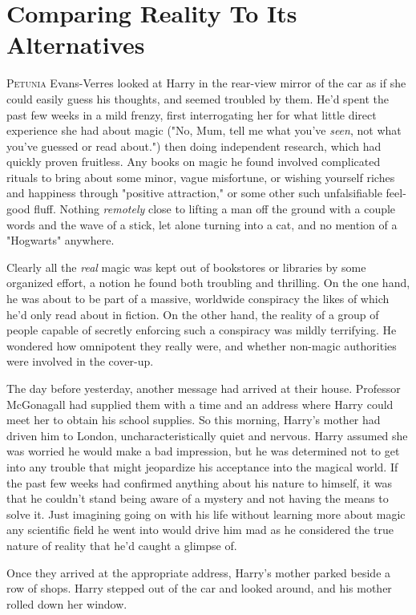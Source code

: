\chapter{Comparing Reality To Its Alternatives}

\lettrine{P}{etunia} Evans-Verres looked at Harry in the rear-view
mirror of the car as if she could easily guess his thoughts,
and seemed troubled by them. He'd spent the past few
weeks in a mild frenzy, first interrogating her for what little
direct experience she had about magic ("No, Mum, tell me
what you've \emph{seen}, not what you've guessed or read
about.") then doing independent research, which had
quickly proven fruitless. Any books on magic he found
involved complicated rituals to bring about some minor,
vague misfortune, or wishing yourself riches and happiness
through "positive attraction," or some other such
unfalsifiable feel-good fluff. Nothing \emph{remotely} close to lifting
a man off the ground with a couple words and the wave
of a stick, let alone turning into a cat, and no mention of
a "Hogwarts" anywhere.

Clearly all the \emph{real} magic was kept out of bookstores or
libraries by some organized effort, a notion he found both
troubling and thrilling. On the one hand, he was about to
be part of a massive, worldwide conspiracy the likes of
which he'd only read about in fiction. On the other hand,
the reality of a group of people capable of secretly
enforcing such a conspiracy was mildly terrifying. He
wondered how omnipotent they really were, and whether
non-magic authorities were involved in the cover-up.

The day before yesterday, another message had
arrived at their house. Professor McGonagall had supplied
them with a time and an address where Harry could meet
her to obtain his school supplies. So this morning, Harry's
mother had driven him to London, uncharacteristically quiet
and nervous. Harry assumed she was worried he would
make a bad impression, but he was determined not to get
into any trouble that might jeopardize his acceptance into
the magical world. If the past few weeks had confirmed
anything about his nature to himself, it was that he
couldn't stand being aware of a mystery and not having
the means to solve it. Just imagining going on with his life
without learning more about magic{\el} any scientific field he
went into would drive him mad as he considered the true
nature of reality that he'd caught a glimpse of.

Once they arrived at the appropriate address, Harry's
mother parked beside a row of shops. Harry stepped out
of the car and looked around, and his mother rolled down
her window.

